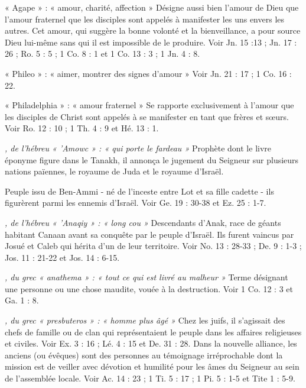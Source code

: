 \begin{multicols}{2}
« Agape » : « amour, charité, affection »
Désigne aussi bien l’amour de Dieu que l’amour fraternel que les disciples sont appelés à manifester les uns envers les autres. Cet amour, qui suggère la bonne volonté et la bienveillance, a pour source Dieu lui-même sans qui il est impossible de le produire. Voir Jn. 15 :13 ; Jn. 17 : 26 ; Ro. 5 : 5 ; 1 Co. 8 : 1 et 1 Co. 13 : 3 ; 1 Jn. 4 : 8.

« Phileo » : « aimer, montrer des signes d’amour »
Voir Jn. 21 : 17 ; 1 Co. 16 : 22.

« Philadelphia » : « amour fraternel »
Se rapporte exclusivement à l’amour que les disciples de Christ sont appelés à se manifester en tant que frères et sœurs. Voir Ro. 12 : 10 ; 1 Th. 4 : 9 et Hé. 13 : 1.

\textit{, de l'hébreu « 'Amowc » : « qui porte le fardeau »}\newline
Prophète dont le livre éponyme figure dans le Tanakh, il annonça le jugement du Seigneur sur plusieurs nations païennes, le royaume de Juda et le royaume d'Israël.

\textit{}\newline
Peuple issu de Ben-Ammi - né de l’inceste entre Lot et sa fille cadette - ils figurèrent parmi les ennemis d'Israël. Voir Ge. 19 : 30-38 et Ez. 25 : 1-7.

\textit{, de l'hébreu « 'Anaqiy » : « long cou »}\newline
Descendants d'Anak, race de géants habitant Canaan avant sa conquête par le peuple d’Israël. Ils furent vaincus par Josué et Caleb qui hérita d’un de leur territoire. Voir No. 13 : 28-33 ; De. 9 : 1-3 ; Jos. 11 : 21-22 et Jos. 14 : 6-15.

\textit{, du grec « anathema » : « tout ce qui est livré au malheur »}\newline
Terme désignant une personne ou une chose maudite, vouée à la destruction. Voir 1 Co. 12 : 3 et Ga. 1 : 8.

\textit{, du grec « presbuteros » : « homme plus âgé »}\newline
Chez les juifs, il s’agissait des chefs de famille ou de clan qui représentaient le peuple dans les affaires religieuses et civiles. Voir Ex. 3 : 16 ; Lé. 4 : 15 et De. 31 : 28.
Dans la nouvelle alliance, les anciens (ou évêques) sont des personnes au témoignage irréprochable dont la mission est de veiller avec dévotion et humilité pour les âmes du Seigneur au sein de l’assemblée locale. Voir Ac. 14 : 23 ; 1 Ti. 5 : 17 ; 1 Pi. 5 : 1-5 et Tite 1 : 5-9.


\end{multicols}
